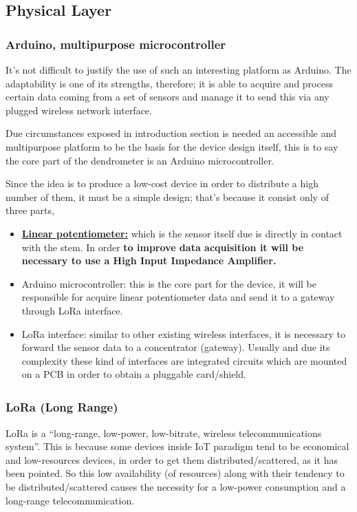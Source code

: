 \documentclass[11pt,a4paper,dvipsnames,twoside]{article}
\newcommand{\doubt}[1] {\textbf{\color{Red3}#1}}
\begin{document}
\subsection{Physical Layer}

\subsubsection{Arduino, multipurpose microcontroller}
It's not difficult to justify the use of such an interesting platform as Arduino. The adaptability is one of its strengths, therefore; it is able to acquire and process certain data coming from a set of sensors and manage it to send this via any plugged wireless network interface.

Due circumstances exposed in introduction section is needed an accessible and multipurpose platform to be the basis for the device design itself, this is to say the core part of the dendrometer is an Arduino microcontroller.  

Since the idea is to produce a low-cost device in order to distribute a high number of them, it must be a simple design; that's because it consist only of three parts,

\begin{itemize}
  \item \href{https://es.rs-online.com/web/p/products/0317780/}{\doubt{Linear potentiometer:}} which is the sensor itself due is directly in contact with the stem. In order \doubt{to improve data acquisition it will be necessary to use a High Input Impedance Amplifier.}
  \item Arduino microcontroller: this is the core part for the device, it will be responsible for acquire linear potentiometer data and send it to a gateway through LoRa interface. 
  \item LoRa interface: similar to other existing wireless interfaces, it is necessary to forward the sensor data to a concentrator (gateway). Usually and due its complexity these kind of interfaces are integrated circuits which are mounted on a PCB in order to obtain a pluggable card/shield. 
\end{itemize}

\subsubsection{\texorpdfstring{LoRa\textsuperscript{\textregistered} (Lo{\normalfont\sffamily ng} Ra{\normalfont\sffamily nge})}{LoRa (Long Range)}}
LoRa is a \enquote{long-range, low-power, low-bitrate, wireless telecommunications system}\cite[]{LoRaGeneral}. This is because some devices inside IoT paradigm tend to be economical and low-resources devices, in order to get them distributed/scattered, as it has been pointed. So this low availability (of resources) along with their tendency to be distributed/scattered causes the necessity for a low-power consumption and a long-range telecommunication.
\end{document}

